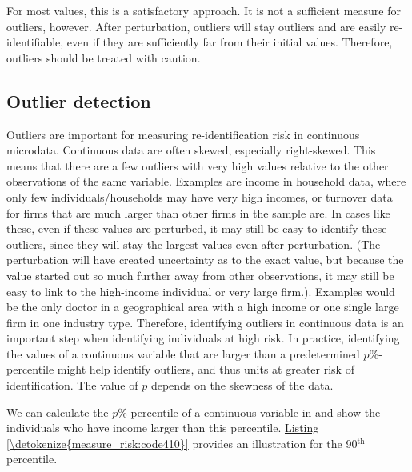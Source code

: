 \documentclass[letterpaper,10pt,english]{sphinxmanual}
\begin{document}
For most values, this is a satisfactory approach. It is not a sufficient
measure for outliers, however. After perturbation, outliers will stay
outliers and are easily re-identifiable, even if they are sufficiently
far from their initial values. Therefore, outliers should be treated
with caution.


\subsection{Outlier detection}
\label{\detokenize{measure_risk:outlier-detection}}
Outliers are important for measuring re-identification risk in
continuous microdata. Continuous data are often skewed, especially
right-skewed. This means that there are a few outliers with very high
values relative to the other observations of the same variable. Examples
are income in household data, where only few individuals/households may
have very high incomes, or turnover data for firms that are much larger
than other firms in the sample are. In cases like these, even if these
values are perturbed, it may still be easy to identify these outliers,
since they will stay the largest values even after perturbation. (The
perturbation will have created uncertainty as to the exact value, but
because the value started out so much further away from other
observations, it may still be easy to link to the high-income individual
or very large firm.). Examples would be the only doctor in a
geographical area with a high income or one single large firm in one
industry type. Therefore, identifying outliers in continuous data is an
important step when identifying individuals at high risk. In practice,
identifying the values of a continuous variable that are larger than a
predetermined \(p\%\)-percentile might help identify outliers, and
thus units at greater risk of identification. The value of \(p\)
depends on the skewness of the data.

We can calculate the \(p\%\)-percentile of a continuous variable in
 and show the individuals who have income larger than this
percentile. \hyperref[\detokenize{measure_risk:code410}]{Listing \ref{\detokenize{measure_risk:code410}}} provides an illustration for the 90$^{\text{th}}$
percentile.
\end{document}
